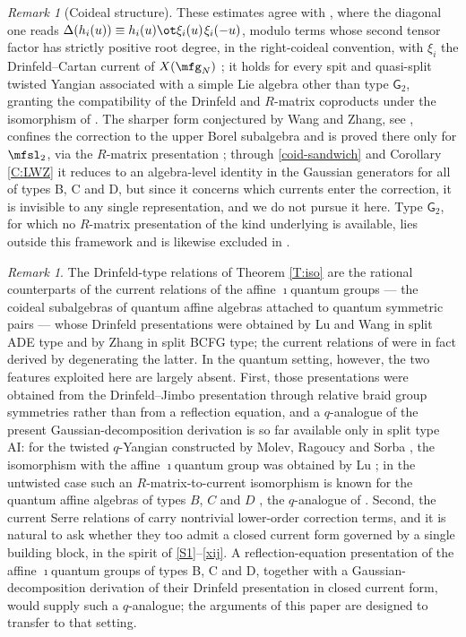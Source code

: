 \documentclass{amsart}
\numberwithin{equation}{section}
\theoremstyle{remark}
\newtheorem{remark}[theorem]{Remark}
\renewcommand{\,}{\kern 0.1em} %
\begin{document}
\begin{remark}[Coideal structure]
These estimates agree with \cite[Thm.~C]{Lu26a}, where the diagonal one reads $\Delta(h_i(u)) \equiv h_i(u) \ot \xi_i(u)\,\xi_i(-u)$, modulo terms whose second tensor factor has strictly positive root degree, in the right-coideal convention, with $\xi_i$ the Drinfeld--Cartan current of $X(\mfg_N)$ \cite{JLM18}; it holds for every spit and quasi-split twisted Yangian associated with a simple Lie algebra other than type $\mathsf{G}_2$, granting the compatibility of the Drinfeld and $R$-matrix coproducts under the isomorphism of \cite{JLM18}. The sharper form conjectured by Wang and Zhang, see \cite[Conj.~5.2]{Lu26a}, confines the correction to the upper Borel subalgebra and is proved there only for $\mfsl_2$, via the $R$-matrix presentation \cite{LWZ25a}; through \eqref{coid-sandwich} and Corollary \ref{C:LWZ} it reduces to an algebra-level identity in the Gaussian generators for all of types B, C and D, but since it concerns which currents enter the correction, it is invisible to any single representation, and we do not pursue it here. Type $\mathsf{G}_2$, for which no $R$-matrix presentation of the kind underlying \cite{JLM18} is available, lies outside this framework and is likewise excluded in \cite[Thm.~C]{Lu26a}.
%
\end{remark}



\begin{remark} \label{R:quantum}
%
The Drinfeld-type relations of Theorem \ref{T:iso} are the rational counterparts of the current relations of the affine $\imath$quantum groups --- the coideal subalgebras of quantum affine algebras attached to quantum symmetric pairs --- whose Drinfeld presentations were obtained by Lu and Wang \cite{LW21} in split ADE type and by Zhang \cite{Zh22} in split BCFG type; the current relations of \cite{LWZ25b} were in fact derived by degenerating the latter. In the quantum setting, however, the two features exploited here are largely absent. First, those presentations were obtained from the Drinfeld--Jimbo presentation through relative braid group symmetries rather than from a reflection equation, and a $q$-analogue of the present Gaussian-decomposition derivation is so far available only in split type AI: for the twisted $q$-Yangian constructed by Molev, Ragoucy and Sorba \cite{MRS03}, the isomorphism with the affine $\imath$quantum group was obtained by Lu \cite{Lu24}; in the untwisted case such an $R$-matrix-to-current isomorphism is known for the quantum affine algebras of types $B$, $C$ and $D$ \cite{JLM20a, JLM20b}, the $q$-analogue of \cite{JLM18}. Second, the current Serre relations of \cite{LW21, Zh22} carry nontrivial lower-order correction terms, and it is natural to ask whether they too admit a closed current form governed by a single building block, in the spirit of \eqref{S1}--\eqref{xij}. A reflection-equation presentation of the affine $\imath$quantum groups of types B, C and D, together with a Gaussian-decomposition derivation of their Drinfeld presentation in closed current form, would supply such a $q$-analogue; the arguments of this paper are designed to transfer to that setting.
%
\end{remark}
\end{document}
